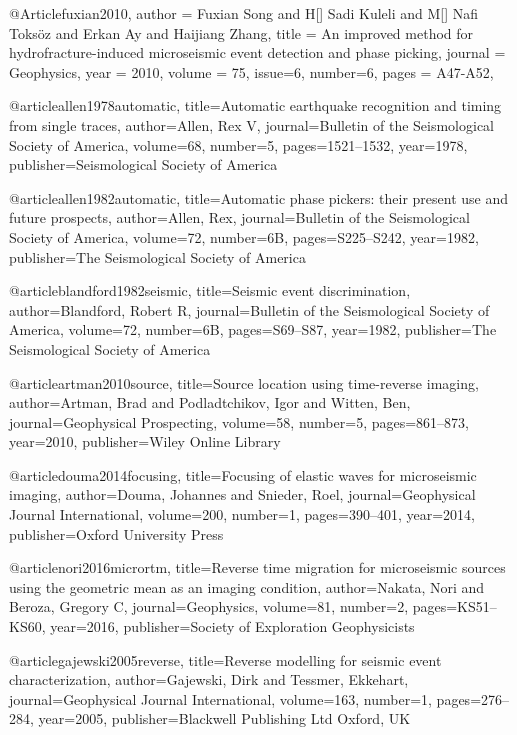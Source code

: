 @Article{fuxian2010,
  author = 	 {Fuxian Song and H[] Sadi Kuleli and M[] Nafi Toks\"{o}z and Erkan Ay and Haijiang Zhang},
  title = 	 {An improved method for hydrofracture-induced microseismic event detection and phase picking},
  journal = 	 {Geophysics},
  year = 	 2010,
  volume =	 75,
  issue=6,
  number=6,
  pages =	 {A47-A52},
}

@article{allen1978automatic,
  title={Automatic earthquake recognition and timing from single traces},
  author={Allen, Rex V},
  journal={Bulletin of the Seismological Society of America},
  volume={68},
  number={5},
  pages={1521--1532},
  year={1978},
  publisher={Seismological Society of America}
}

@article{allen1982automatic,
  title={Automatic phase pickers: their present use and future prospects},
  author={Allen, Rex},
  journal={Bulletin of the Seismological Society of America},
  volume={72},
  number={6B},
  pages={S225--S242},
  year={1982},
  publisher={The Seismological Society of America}
}

@article{blandford1982seismic,
  title={Seismic event discrimination},
  author={Blandford, Robert R},
  journal={Bulletin of the Seismological Society of America},
  volume={72},
  number={6B},
  pages={S69--S87},
  year={1982},
  publisher={The Seismological Society of America}
}

@article{artman2010source,
  title={Source location using time-reverse imaging},
  author={Artman, Brad and Podladtchikov, Igor and Witten, Ben},
  journal={Geophysical Prospecting},
  volume={58},
  number={5},
  pages={861--873},
  year={2010},
  publisher={Wiley Online Library}
}

@article{douma2014focusing,
  title={Focusing of elastic waves for microseismic imaging},
  author={Douma, Johannes and Snieder, Roel},
  journal={Geophysical Journal International},
  volume={200},
  number={1},
  pages={390--401},
  year={2014},
  publisher={Oxford University Press}
}

@article{nori2016micrortm,
  title={Reverse time migration for microseismic sources using the geometric mean as an imaging condition},
  author={Nakata, Nori and Beroza, Gregory C},
  journal={Geophysics},
  volume={81},
  number={2},
  pages={KS51--KS60},
  year={2016},
  publisher={Society of Exploration Geophysicists}
}


@article{gajewski2005reverse,
  title={Reverse modelling for seismic event characterization},
  author={Gajewski, Dirk and Tessmer, Ekkehart},
  journal={Geophysical Journal International},
  volume={163},
  number={1},
  pages={276--284},
  year={2005},
  publisher={Blackwell Publishing Ltd Oxford, UK}
}


